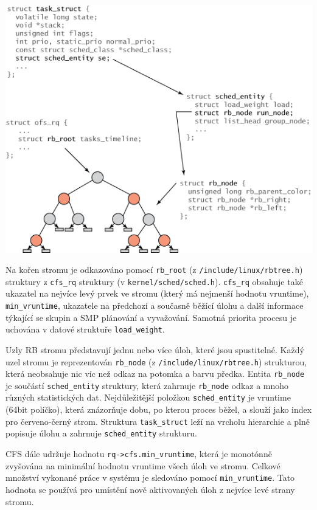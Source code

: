 \documentclass[a4paper,12pt]{article}
\begin{document}
\includegraphics[scale=1]{obrazky/schedulerStructures.png}

Na kořen stromu je odkazováno pomocí \verb#rb_root# (z \verb#/include/linux/rbtree.h#) struktury z \verb#cfs_rq# struktury (v \verb#kernel/sched/sched.h#).
\verb#cfs_rq# obsahuje také ukazatel na nejvíce levý prvek ve stromu (který má nejmenší hodnotu vruntime), \verb#min_vruntime#, ukazatele na předchozí a současně běžící úlohu a další informace týkající se skupin a SMP plánování a vyvažování. Samotná priorita procesu je uchována v datové struktuře \verb#load_weight#. 

Uzly RB stromu představují jednu nebo více úloh, které jsou spustitelné. Každý uzel stromu je reprezentován \verb#rb_node# (z \verb#/include/linux/rbtree.h#) strukturou, která neobsahuje nic víc než odkaz na potomka a barvu předka. Entita \verb#rb_node# je součástí \verb#sched_entity# struktury, která zahrnuje \verb#rb_node# odkaz a mnoho různých statistických dat. Nejdůležitější položkou \verb#sched_entity# je vruntime (64bit políčko), která znázorňuje dobu, po kterou proces běžel, a slouží jako index pro červeno-černý strom. Struktura \verb#task_struct# leží na vrcholu hierarchie a plně popisuje úlohu a zahrnuje \verb#sched_entity# strukturu. 

CFS dále udržuje hodnotu \verb#rq->cfs.min_vruntime#, která je monotónně zvyšována na minimální hodnotu vruntime všech úloh ve stromu. Celkové množství vykonané práce v systému je sledováno pomocí \verb#min_vruntime#. Tato hodnota se používá pro umístění nově aktivovaných úloh z nejvíce levé strany stromu.
\end{document}
